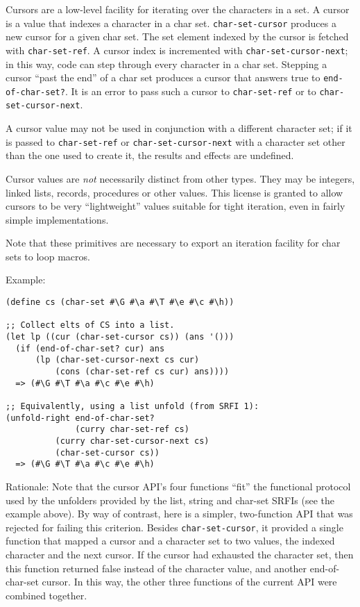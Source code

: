 \begin{entry}{%
  }

  Cursors
  are a low-level facility for iterating over the characters in a
  set. A cursor is a value that indexes a character in a char set.
  \texttt{char-set-cursor} produces a new cursor for a given char
  set. The set element indexed by the cursor is fetched with
  \texttt{char-set-ref}.  A cursor index is incremented with
  \texttt{char-set-cursor-next}; in this way, code can step through
  every character in a char set. Stepping a cursor ``past the end'' of
  a char set produces a cursor that answers true to
  \texttt{end-of-char-set?}. It is an error to pass such a cursor to
  \texttt{char-set-ref} or to \texttt{char-set-cursor-next}.

  A cursor value may not be used in conjunction with a different
  character set; if it is passed to \texttt{char-set-ref} or
  \texttt{char-set-cursor-next} with a character set other than the
  one used to create it, the results and effects are undefined.

  Cursor values are \emph{not} necessarily distinct from other
  types. They may be integers, linked lists, records, procedures or
  other values. This license is granted to allow cursors to be very
  ``lightweight'' values suitable for tight iteration, even in fairly
  simple implementations.

  Note that these primitives are necessary to export an iteration
  facility for char sets to loop macros.

  Example:

\begin{verbatim}
(define cs (char-set #\G #\a #\T #\e #\c #\h))

;; Collect elts of CS into a list.
(let lp ((cur (char-set-cursor cs)) (ans '()))
  (if (end-of-char-set? cur) ans
      (lp (char-set-cursor-next cs cur)
          (cons (char-set-ref cs cur) ans))))
  => (#\G #\T #\a #\c #\e #\h)

;; Equivalently, using a list unfold (from SRFI 1):
(unfold-right end-of-char-set? 
              (curry char-set-ref cs)
          (curry char-set-cursor-next cs)
          (char-set-cursor cs))
  => (#\G #\T #\a #\c #\e #\h)
\end{verbatim}

  Rationale: Note that the cursor API's four functions ``fit'' the
  functional protocol used by the unfolders provided by the list,
  string and char-set SRFIs (see the example above). By way of
  contrast, here is a simpler, two-function API that was rejected for
  failing this criterion. Besides \texttt{char-set-cursor}, it
  provided a single function that mapped a cursor and a character set
  to two values, the indexed character and the next cursor. If the
  cursor had exhausted the character set, then this function returned
  false instead of the character value, and another end-of-char-set
  cursor. In this way, the other three functions of the current API
  were combined together.
\end{entry}

